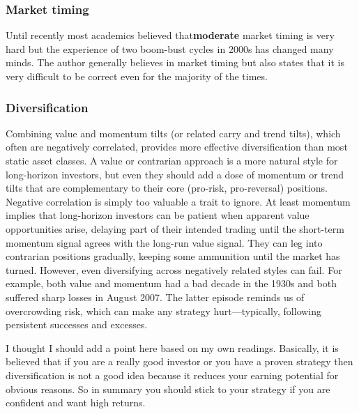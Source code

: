 \documentclass[12 pt]{article}
\begin{document}
\subsubsection{Market timing}
Until recently most academics believed that\textbf{moderate} market timing is very hard but the experience of two boom-bust cycles in 2000s has changed many minds. The author generally believes in market timing but also states that it is very difficult to be correct even for the majority of the times. 
\subsubsection{Diversification}
Combining value and momentum tilts (or related carry and trend tilts), which often are negatively correlated, provides more
effective diversification than most static asset classes. A value or contrarian approach is a more natural style for long-horizon investors, but even they should add a dose of momentum or trend tilts that are complementary to their core (pro-risk, pro-reversal) positions. Negative correlation is simply too valuable a trait to ignore. At least momentum implies that long-horizon investors can be patient when apparent value opportunities arise, delaying part of their intended trading until the short-term momentum signal agrees with the long-run value signal. They can leg into contrarian positions gradually, keeping some ammunition until the market has turned. However, even diversifying across negatively related styles can fail. For example, both value and momentum had a bad decade in the 1930s and
both suffered sharp losses in August 2007. The latter episode reminds us of overcrowding risk, which can make any strategy hurt—typically,
following persistent successes and excesses.
\par I thought I should add a point here based on my own readings. Basically, it is believed that if you are a really good investor or you have a proven strategy then diversification is not a good idea because it reduces your earning potential for obvious reasons. So in summary you should stick to your strategy if you are confident and want high returns. 
\end{document}
